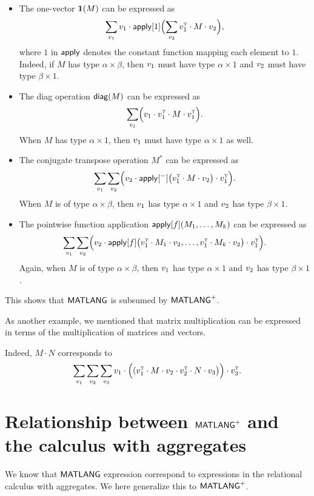 \begin{itemize}
\item The one-vector $\mathbf{1}(M)$ can be expressed as 
$$
\sum_{v_1} v_1\cdot  \mathsf{apply}[1]\Bigl(\sum_{v_2} v_1^{\textsc{t}}\cdot M\cdot v_2\Bigr),
$$
where $1$ in $\mathsf{apply}$ denotes the constant function mapping each element to $1$. Indeed, if $M$ has type
$\alpha\times\beta$, then $v_1$ must have type $\alpha\times 1$ and $v_2$ must  have type $\beta\times 1$. 
\item The diag operation $\mathsf{diag}(M)$ can be expressed as 
$$
\sum_{v_1} \Bigl(v_1\cdot v_1^{\textsc{t}}\cdot M \cdot v_1^{\textsc{t}}\Bigr). 
$$
When $M$ has type $\alpha\times 1$, then $v_1$ must have type $\alpha\times 1$ as well.
\item The conjugate transpose operation $M^*$ can be expressed as 
$$
\sum_{v_1}\sum_{v_2} \Bigl(v_2\cdot\mathsf{apply}[^-]\bigl(v_1^{\textsc{t}}\cdot M\cdot v_2\bigr)\cdot v_1^{\textsc{t}}\Bigr).
$$
When $M$ is of type $\alpha\times\beta$, then $v_1$ has type $\alpha\times 1$ and $v_2$ has type $\beta\times 1$.
\item The pointwise function application $\mathsf{apply}[f](M_1,\ldots,M_k)$ can be expressed as 
$$
\sum_{v_1}\sum_{v_2} \Bigl(v_2\cdot\mathsf{apply}[f]\bigl(v_1^{\textsc{t}}\cdot M_1\cdot v_2,\ldots,v_1^{\textsc{t}}\cdot M_k\cdot v_2\bigr)\cdot v_1^{\textsc{t}}\Bigr).
$$
Again, when $M$ is of type $\alpha\times\beta$, then $v_1$ has type $\alpha\times 1$ and $v_2$ has type $\beta\times 1$.
\end{itemize}
This shows that $\mathsf{MATLANG}$ is subsumed by $\mathsf{MATLANG}^{\sf +}$.


As another example, we mentioned that matrix multiplication can be expressed in terms of the multiplication of matrices and vectors.
\begin{example}
Indeed, $M\cdot N$ corresponds to
$$
\sum_{v_1}\sum_{v_2} \sum_{v_3} v_1 \cdot\Bigl( (v_1^{\textsc{t}}\cdot M\cdot v_2\cdot v_2^{\textsc{t}}\cdot N\cdot v_3\bigr)\Bigr)\cdot v_3^{\textsc{t}}.
$$
\end{example}



\section{Relationship between $\mathsf{MATLANG}^{\sf +}$ and the calculus with aggregates}
We know that $\mathsf{MATLANG}$ expression correspond to expressions in the relational calculus with aggregates. We here generalize this to $\mathsf{MATLANG}^{\sf +}$.

